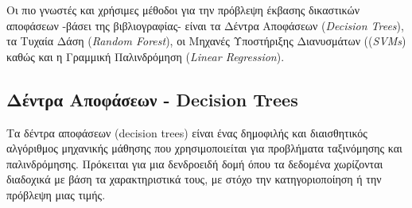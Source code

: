 \documentclass[diploma]{softlab-thesis}
\begin{document}
Οι πιο γνωστές και χρήσιμες μέθοδοι για την πρόβλεψη έκβασης δικαστικών αποφάσεων -βάσει της βιβλιογραφίας- είναι τα Δέντρα Αποφάσεων (\textit{Decision Trees}), τα Τυχαία Δάση (\textit{Random  Forest}), οι Μηχανές Υποστήριξης Διανυσμάτων ((\textit{SVMs}) καθώς και η Γραμμική Παλινδρόμηση (\textit{Linear Regression}). 

\subsection{Δέντρα Αποφάσεων - Decision Trees}

Τα δέντρα αποφάσεων (decision trees) είναι ένας δημοφιλής και διαισθητικός αλγόριθμος μηχανικής μάθησης που χρησιμοποιείται για προβλήματα ταξινόμησης και παλινδρόμησης. Πρόκειται για μια δενδροειδή δομή όπου τα δεδομένα χωρίζονται διαδοχικά με βάση τα χαρακτηριστικά τους, με στόχο την κατηγοριοποίηση ή την πρόβλεψη μιας τιμής.
\end{document}
